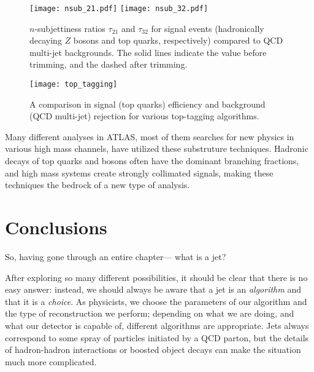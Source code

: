 
\begin{figure}
\centering
\texttt{[image: nsub\_21.pdf]}
\texttt{[image: nsub\_32.pdf]}
\label{fig:jets:nsub}
\caption{$n$-subjettiness ratios $\tau_{21}$ and $\tau_{32}$ for signal events (hadronically decaying $Z$ bosons and top quarks, respectively) compared to QCD multi-jet backgrounds. The solid lines indicate the value before trimming, and the dashed after trimming.}
\end{figure}




\begin{figure}
\centering
\texttt{[image: top\_tagging]}
\label{fig:jets:top_tagging}
\caption{A comparison in signal (top quarks) efficiency and background (QCD multi-jet) rejection for various top-tagging algorithms.}
\end{figure}





Many different analyses in ATLAS, most of them searches for new physics in various high mass channels, have utilized these substruture techniques. Hadronic decays of top quarks and bosons often have the dominant branching fractions, and high mass systems create strongly collimated signals, making these techniques the bedrock of a new type of analysis. 

\section{Conclusions}

So, having gone through an entire chapter--- what is a jet?

After exploring so many different possibilities, it should be clear that there is no easy answer: instead, we should always be aware that a jet is an \textit{algorithm} and that it is a \textit{choice}. As physicists, we choose the parameters of our algorithm and the type of reconstruction we perform; depending on what we are doing, and what our detector is capable of, different algorithms are appropriate. Jets always correspond to some spray of particles initiated by a QCD parton, but the details of hadron-hadron interactions or boosted object decays can make the situation much more complicated.

